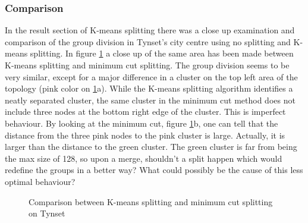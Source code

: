 \subsubsection{Comparison}
In the result section of K-means splitting there was a close up examination and comparison of the group division in Tynset's city centre using no splitting and K-means splitting.
In figure \ref{fig:mincutcomparison} a close up of the same area has been made between K-means splitting and minimum cut splitting. The group division seems to 
be very similar, except for a major difference in a cluster on the top left area of the topology (pink color on \ref{fig:mincutcomparison}a).
While the K-means splitting algorithm identifies a neatly separated cluster, the same cluster in the minimum cut method does not include three nodes at the bottom right edge of the cluster.
This is imperfect  behaviour. By looking at the minimum cut, figure \ref{fig:mincutcomparison}b, one can tell that the distance from the three pink nodes to the pink cluster is large.
Actually, it is larger than the distance to the green cluster. The green cluster is far from being the max size of 128, so upon a merge, shouldn't a split happen which would redefine the
groups in a better way? What could possibly be the cause of this less optimal behaviour?
\begin{figure}
	\centering
		\qquad
		\caption{Comparison between K-means splitting and minimum cut splitting on Tynset}%
		\label{fig:mincutcomparison}%
\end{figure}



